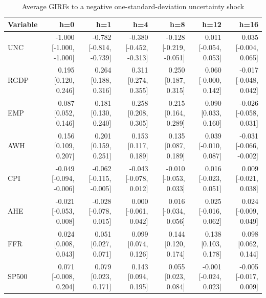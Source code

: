 \begin{table}[htbp]
\centering
\caption{Average GIRFs to a negative one-standard-deviation uncertainty shock}
\label{tab:girfneg}
\begin{tabular}{lrrrrrr}
\toprule
Variable & h=0 & h=1 & h=4 & h=8 & h=12 & h=16 \\
\midrule
UNC & -1.000 [-1.000, -1.000] & -0.782 [-0.814, -0.739] & -0.380 [-0.452, -0.313] & -0.128 [-0.219, -0.051] & 0.011 [-0.054, 0.053] & 0.035 [-0.004, 0.065] \\
RGDP & 0.195 [0.120, 0.246] & 0.264 [0.188, 0.316] & 0.311 [0.274, 0.355] & 0.250 [0.187, 0.315] & 0.060 [-0.000, 0.142] & -0.017 [-0.048, 0.042] \\
EMP & 0.087 [0.052, 0.146] & 0.181 [0.130, 0.240] & 0.258 [0.208, 0.305] & 0.215 [0.164, 0.289] & 0.090 [0.033, 0.160] & -0.026 [-0.058, 0.031] \\
AWH & 0.156 [0.109, 0.207] & 0.201 [0.159, 0.251] & 0.153 [0.117, 0.189] & 0.135 [0.087, 0.189] & 0.039 [-0.010, 0.087] & -0.031 [-0.066, -0.002] \\
CPI & -0.049 [-0.094, -0.006] & -0.062 [-0.115, -0.005] & -0.043 [-0.078, 0.012] & -0.010 [-0.053, 0.033] & 0.016 [-0.023, 0.051] & 0.009 [-0.021, 0.038] \\
AHE & -0.021 [-0.053, 0.008] & -0.028 [-0.078, 0.015] & 0.000 [-0.061, 0.042] & 0.016 [-0.034, 0.056] & 0.025 [-0.016, 0.062] & 0.024 [-0.009, 0.049] \\
FFR & 0.024 [0.008, 0.043] & 0.051 [0.027, 0.071] & 0.099 [0.074, 0.126] & 0.144 [0.120, 0.174] & 0.138 [0.103, 0.178] & 0.098 [0.062, 0.144] \\
SP500 & 0.071 [-0.008, 0.204] & 0.079 [0.023, 0.171] & 0.143 [0.094, 0.195] & 0.055 [0.023, 0.084] & -0.001 [-0.024, 0.023] & -0.005 [-0.017, 0.009] \\
\bottomrule
\end{tabular}
\end{table}